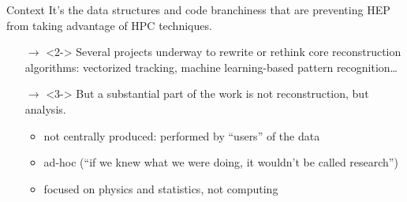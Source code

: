 \documentclass[aspectratio=169]{beamer}
\begin{document}
\begin{frame}{Context}
\vspace{0.5 cm}
It's the data structures and code branchiness that are preventing HEP from taking advantage of HPC techniques.

\vspace{0.25 cm}
\begin{itemize}\setlength{\itemsep}{0.5 cm}
\item[$\rightarrow$]<2-> Several projects underway to rewrite or rethink core reconstruction algorithms: vectorized tracking, machine learning-based pattern recognition\ldots

\item[$\rightarrow$]<3-> But a substantial part of the work is not reconstruction, but analysis.

\vspace{0.05 cm}
\begin{itemize}\setlength{\itemsep}{0.1 cm}
\item<4-> not centrally produced: performed by ``users'' of the data
\item<5-> ad-hoc (``if we knew what we were doing, it wouldn't be called research'')
\item<6-> focused on physics and statistics, not computing
\end{itemize}
\end{itemize}
\end{frame}
\end{document}
